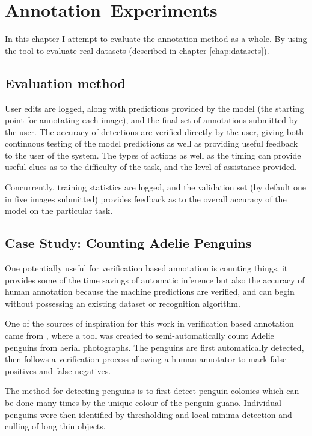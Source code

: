 \chapter{Annotation~Experiments}
\label{chap:annotation} 

In this chapter I attempt to evaluate the annotation method as a whole. By using the tool to evaluate real datasets (described in chapter-\ref{chap:datasets}). 


\section {Evaluation method}




User edits are logged, along with predictions provided by the model (the starting point for annotating each image), and the final set of annotations submitted by the user. The accuracy of detections are verified directly by the user, giving both continuous testing of the model predictions as well as providing useful feedback to the user of the system. The types of actions as well as the timing can provide useful clues as to the difficulty of the task, and the level of assistance provided.

Concurrently, training statistics are logged, and the validation set (by default one in five images submitted) provides feedback as to the overall accuracy of the model on the particular task.



\section{Case Study: Counting Adelie Penguins}

One potentially useful for verification based annotation is counting things, it provides some of the time savings of automatic inference but also the accuracy of human annotation because the machine predictions are verified, and can begin without possessing an existing dataset or recognition algorithm.


One of the sources of inspiration for this work in verification based annotation came from \cite{McNeill2011}, where a tool was created to semi-automatically count Adelie penguins from aerial photographs. The penguins are first automatically detected, then follows a verification process allowing a human annotator to mark false positives and false negatives.

The method for detecting penguins is to first detect penguin colonies which can be done many times by the unique colour of the penguin guano. Individual penguins were then identified by thresholding and local minima detection and culling of long thin objects. 


